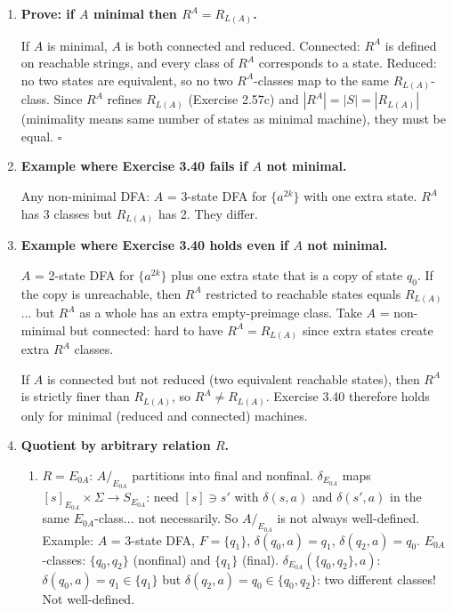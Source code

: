 \begin{enumerate}[{3.}1.]
\item \textbf{Prove: if $A$ minimal then $R^A=R_{L(A)}$.}

If $A$ is minimal, $A$ is both connected and reduced. Connected: $R^A$ is defined on reachable strings, and every class of $R^A$ corresponds to a state. Reduced: no two states are equivalent, so no two $R^A$-classes map to the same $R_{L(A)}$-class. Since $R^A$ refines $R_{L(A)}$ (Exercise 2.57c) and $|R^A|=|S|=|R_{L(A)}|$ (minimality means same number of states as minimal machine), they must be equal. $\square$

\item \textbf{Example where Exercise 3.40 fails if $A$ not minimal.}

Any non-minimal DFA: $A$ = 3-state DFA for $\{a^{2k}\}$ with one extra state. $R^A$ has 3 classes but $R_{L(A)}$ has 2. They differ.

\item \textbf{Example where Exercise 3.40 holds even if $A$ not minimal.}

$A$ = 2-state DFA for $\{a^{2k}\}$ plus one extra state that is a copy of state $q_0$. If the copy is unreachable, then $R^A$ restricted to reachable states equals $R_{L(A)}$... but $R^A$ as a whole has an extra empty-preimage class. Take $A$ = non-minimal but connected: hard to have $R^A=R_{L(A)}$ since extra states create extra $R^A$ classes.

If $A$ is connected but not reduced (two equivalent reachable states), then $R^A$ is strictly finer than $R_{L(A)}$, so $R^A\neq R_{L(A)}$. Exercise 3.40 therefore holds only for minimal (reduced and connected) machines.

\item \textbf{Quotient by arbitrary relation $R$.}

\begin{enumerate}
\item $R=E_{0A}$: $A/_{E_{0A}}$ partitions into final and nonfinal. $\delta_{E_{0A}}$ maps $[s]_{E_{0A}}\times\Sigma\to S_{E_{0A}}$: need $[s]\ni s'$ with $\delta(s,a)$ and $\delta(s',a)$ in the same $E_{0A}$-class... not necessarily. So $A/_{E_{0A}}$ is not always well-defined. Example: $A$ = 3-state DFA, $F=\{q_1\}$, $\delta(q_0,a)=q_1$, $\delta(q_2,a)=q_0$. $E_{0A}$-classes: $\{q_0,q_2\}$ (nonfinal) and $\{q_1\}$ (final). $\delta_{E_{0A}}(\{q_0,q_2\},a)$: $\delta(q_0,a)=q_1\in\{q_1\}$ but $\delta(q_2,a)=q_0\in\{q_0,q_2\}$: two different classes! Not well-defined.


\end{enumerate}
\end{enumerate}
